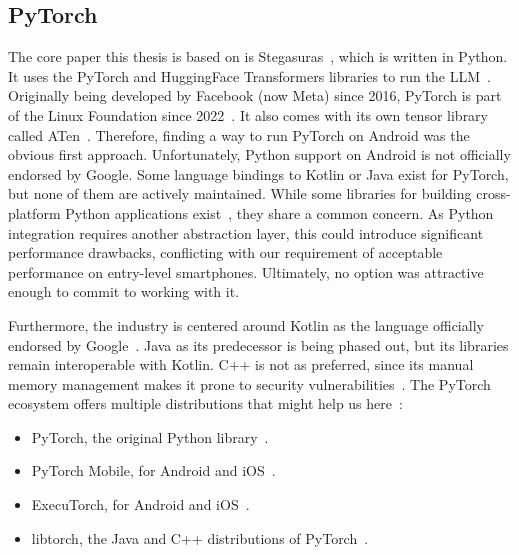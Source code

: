 \subsection{PyTorch}
\label{sec:pyTorch}
The core paper this thesis is based on is Stegasuras~\cite{zieglerNeuralLinguisticSteganography2019}, which is written in Python. It uses the PyTorch and HuggingFace Transformers libraries to run the \gls{LLM}~\cite{zieglerStegasuras2025,anselPyTorch2Faster2024,wolfTransformersStateoftheArtNatural2020}. Originally being developed by Facebook (now Meta) since 2016, PyTorch is part of the Linux Foundation since 2022~\cite{chintalaPyTorchStrengthensIts2022}. It also comes with its own tensor library called ATen~\cite{devitoZdevitoATen2025}. Therefore, finding a way to run PyTorch on Android was the obvious first approach. Unfortunately, Python support on Android is not officially endorsed by Google. Some language bindings to Kotlin or Java exist for PyTorch, but none of them are actively maintained. While some libraries for building cross-platform Python applications exist~\cite{kivyKivyKivy2025,beewareBeewareToga2025,chaquoChaquoChaquopy2025}, they share a common concern. As Python integration requires another abstraction layer, this could introduce significant performance drawbacks, conflicting with our requirement of acceptable performance on entry-level smartphones. Ultimately, no option was attractive enough to commit to working with it.

Furthermore, the industry is centered around Kotlin as the language officially endorsed by Google~\cite{ruggiaDarkSideNative2025}. Java as its predecessor is being phased out, but its libraries remain interoperable with Kotlin. C++ is not as preferred, since its manual memory management makes it prone to security vulnerabilities~\cite{ruggiaDarkSideNative2025}. The PyTorch ecosystem offers multiple distributions that might help us here~\cite{pytorchPyTorch}:
\begin{itemize}
	\item PyTorch, the original Python library~\cite{anselPyTorch2Faster2024}.
	\item PyTorch Mobile, for Android and iOS~\cite{pytorchPytorchAndroiddemoapp2025}.
	\item ExecuTorch, for Android and iOS~\cite{pytorchPytorchExecutorch2025}.
	\item libtorch, the Java and C++ distributions of PyTorch~\cite{pytorchStartLocally,pytorchPyTorchAPIPyTorch}.
\end{itemize}

